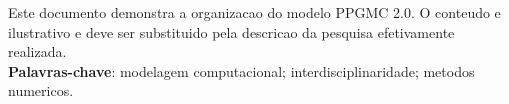 Este documento demonstra a organizacao do modelo PPGMC 2.0. O conteudo e ilustrativo e deve ser substituido pela descricao da pesquisa efetivamente realizada.\\
\textbf{Palavras-chave}: modelagem computacional; interdisciplinaridade; metodos numericos.
